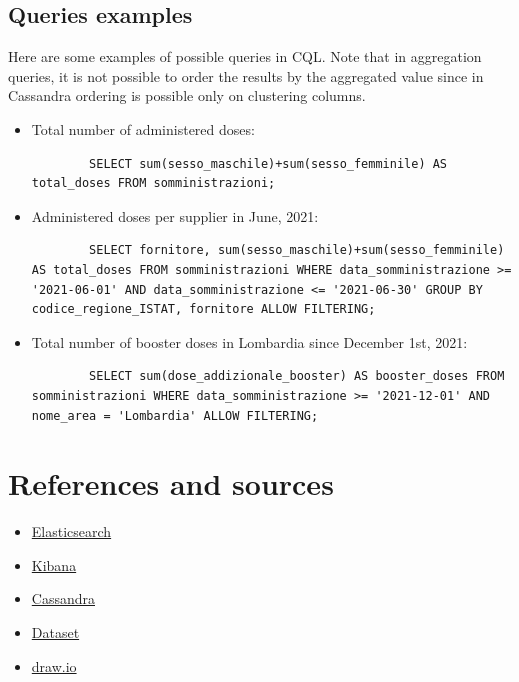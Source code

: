 \documentclass{article}
\begin{document}
\subsection{Queries examples}
Here are some examples of possible queries in CQL. Note that in aggregation queries, it is not possible to order the results by the aggregated value since in Cassandra ordering is possible only on clustering columns. 
\begin{itemize}
    \item Total number of administered doses: 
        \begin{lstlisting}
        SELECT sum(sesso_maschile)+sum(sesso_femminile) AS total_doses FROM somministrazioni;
        \end{lstlisting}
    \item Administered doses per supplier in June, 2021: 
        \begin{lstlisting}
        SELECT fornitore, sum(sesso_maschile)+sum(sesso_femminile) AS total_doses FROM somministrazioni WHERE data_somministrazione >= '2021-06-01' AND data_somministrazione <= '2021-06-30' GROUP BY codice_regione_ISTAT, fornitore ALLOW FILTERING;
        \end{lstlisting}
    \item Total number of booster doses in Lombardia since December 1st, 2021: 
        \begin{lstlisting}
        SELECT sum(dose_addizionale_booster) AS booster_doses FROM somministrazioni WHERE data_somministrazione >= '2021-12-01' AND nome_area = 'Lombardia' ALLOW FILTERING;
        \end{lstlisting}
\end{itemize}

\section{References and sources}
\begin{itemize}
    \item \href{https://www.elastic.co}{Elasticsearch}
    \item \href{https://www.elastic.co/kibana/}{Kibana}
    \item \href{https://cassandra.apache.org/_/index.html}{Cassandra}
    \item \href{https://github.com/italia/covid19-opendata-vaccini}{Dataset}
    \item \href{https://app.diagrams.net}{draw.io}
\end{itemize}
\end{document}
